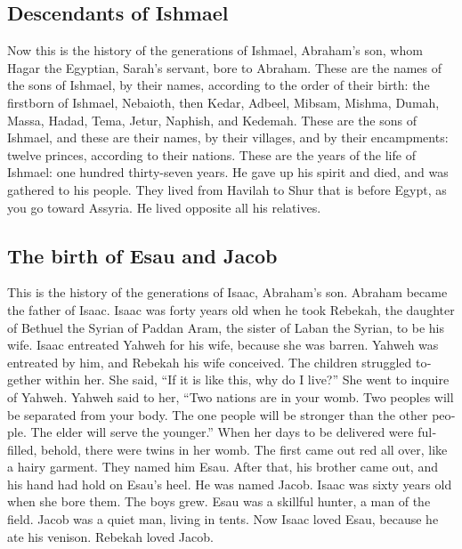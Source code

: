 \begin{paracol}{2}
\begin{otherlanguage}{english}
\hypertarget{descendants-of-ishmael}{%
\subsection{Descendants of Ishmael}\label{descendants-of-ishmael}}

 Now this is the history of the generations of Ishmael,
Abraham's son, whom Hagar the Egyptian, Sarah's servant, bore to
Abraham.  These are the names of the sons of Ishmael, by
their names, according to the order of their birth: the firstborn of
Ishmael, Nebaioth, then Kedar, Adbeel, Mibsam,  Mishma,
Dumah, Massa,  Hadad, Tema, Jetur, Naphish, and Kedemah.
 These are the sons of Ishmael, and these are their
names, by their villages, and by their encampments: twelve princes,
according to their nations.  These are the years of the
life of Ishmael: one hundred thirty-seven years. He gave up his spirit
and died, and was gathered to his people.  They lived
from Havilah to Shur that is before Egypt, as you go toward Assyria. He
lived opposite all his relatives.

\hypertarget{the-birth-of-esau-and-jacob}{%
\subsection{The birth of Esau and
Jacob}\label{the-birth-of-esau-and-jacob}}

 This is the history of the generations of Isaac,
Abraham's son. Abraham became the father of Isaac.  Isaac
was forty years old when he took Rebekah, the daughter of Bethuel the
Syrian of Paddan Aram, the sister of Laban the Syrian, to be his wife.
 Isaac entreated Yahweh for his wife, because she was
barren. Yahweh was entreated by him, and Rebekah his wife conceived.
 The children struggled together within her. She said,
``If it is like this, why do I live?'' She went to inquire of Yahweh.
 Yahweh said to her, ``Two nations are in your womb. Two
peoples will be separated from your body. The one people will be
stronger than the other people. The elder will serve the younger.''
 When her days to be delivered were fulfilled, behold,
there were twins in her womb.  The first came out red all
over, like a hairy garment. They named him Esau.  After
that, his brother came out, and his hand had hold on Esau's heel. He was
named Jacob. Isaac was sixty years old when she bore them.
 The boys grew. Esau was a skillful hunter, a man of the
field. Jacob was a quiet man, living in tents.  Now Isaac
loved Esau, because he ate his venison. Rebekah loved Jacob.


\end{otherlanguage}
\end{paracol}
